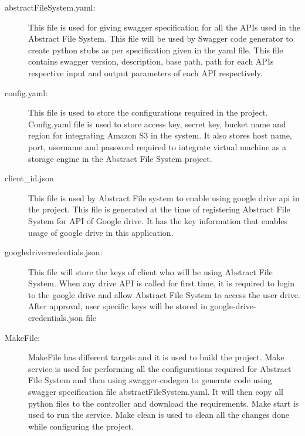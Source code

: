 \begin{description}



\item[abstractFileSystem.yaml:]


This file is used for giving swagger specification for all the APIs used in 
the Abstract File System. This file will be used by Swagger code generator to 
create python stubs as per specification given in the yaml file.
This file contains swagger version, description, base path, path for each APIs 
respective input and output parameters of each API respectively.

\item[config.yaml:]


This file is used to store the configurations required in the project. 
Config.yaml file is used to store access key, secret key, bucket name and 
region for integrating Amazon S3 in the system. It also stores host name, 
port, username and password required to integrate virtual machine as a storage 
engine in the Abstract File System project.

\item[client\_id.json]


This file is used by Abstract File system to enable using google drive api in 
the project. This file is generated at the time of registering Abstract File 
System for API of Google drive. It has the key information that enables usage 
of google drive in this application. 

\item[google\-drive\-credentials.json:]


This file will store the keys of client who will be using Abstract File 
System. When any drive API is called for first time, it is required to login 
to the google drive and allow Abstract File System to access the user drive. 
After approval, user specific keys will be stored in 
google-drive-credentials.json file

\item[MakeFile:]


MakeFile has different targets and it is used to build the project. 
Make service is used for performing all the configurations required for 
Abstract File System and then using swagger-codegen to generate code using 
swagger specification file abstractFileSystem.yaml. It will then copy all 
python files to the controller and download the requirements. Make start is 
used to run the service. Make clean is used to clean all the changes done 
while configuring the project. 



\end{description}
